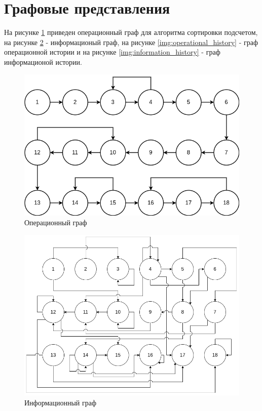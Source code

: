 \section{Графовые представления}

На рисунке \ref{img:operational} приведен операционный граф для алгоритма сортировки подсчетом, на рисунке \ref{img:information} - информационый граф, на рисунке \ref{img:operational_history} - граф операционной истории и на рисунке \ref{img:information_history} - граф информационой истории.


\begin{figure}[H]
	\begin{center}
		\includegraphics[scale=0.5]{img/operational.png}
	\end{center}
	\captionsetup{justification=centering}
	\caption{Операционный граф}
	\label{img:operational}
\end{figure}

\begin{figure}[H]
	\begin{center}
		\includegraphics[scale=0.5]{img/information.png}
	\end{center}
	\captionsetup{justification=centering}
	\caption{Информационный граф}
	\label{img:information}
\end{figure}

